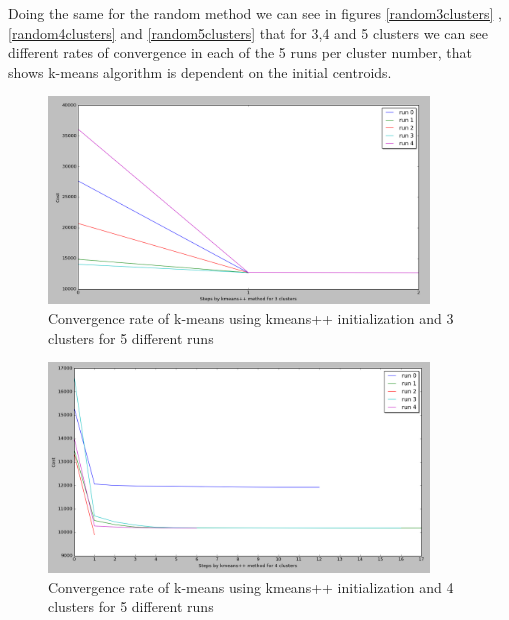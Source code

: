 Doing the same for the random method we can see in figures \ref{random3clusters} , \ref{random4clusters} and \ref{random5clusters} that for 3,4 and 5 clusters we can see different rates of convergence in each of the 5 runs per cluster number, that shows k-means algorithm is dependent on the initial centroids.

\begin{figure}[!htb]
\centering
\includegraphics[width=0.9\textwidth]{shots/kmeans++3clusters.png}
\caption{ Convergence rate of k-means using kmeans++ initialization and 3 clusters for 5 different runs   }
\label{kmeans++3clusters}
\end{figure}



\begin{figure}[!htb]
\centering
\includegraphics[width=0.9\textwidth]{shots/kmeans++4clusters.png}
\caption{Convergence rate of k-means using kmeans++ initialization and 4 clusters for 5 different runs  }
\label{kmeans++4clusters}
\end{figure}


